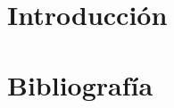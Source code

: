 \documentclass[a4paper]{article}
\begin{document}
\pagestyle{empty}


\pagestyle{plain}
\hyperblue

\part{Introducción}


\newpage
\part{Bibliografía}


\end{document}

